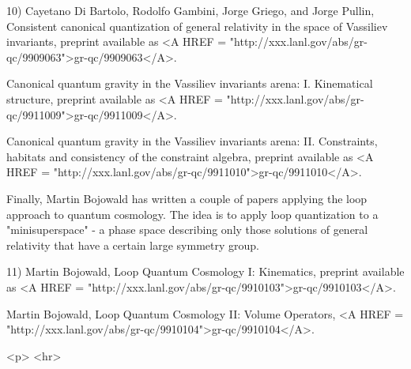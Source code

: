 10) Cayetano Di Bartolo, Rodolfo Gambini, Jorge Griego, and Jorge
Pullin, Consistent canonical quantization of general relativity in the
space of Vassiliev invariants, preprint available as <A HREF = "http://xxx.lanl.gov/abs/gr-qc/9909063">gr-qc/9909063</A>.

Canonical quantum gravity in the Vassiliev invariants arena:
I. Kinematical structure, preprint available as <A HREF = "http://xxx.lanl.gov/abs/gr-qc/9911009">gr-qc/9911009</A>.

Canonical quantum gravity in the Vassiliev invariants arena: II. 
Constraints, habitats and consistency of the constraint algebra,
preprint available as <A HREF = "http://xxx.lanl.gov/abs/gr-qc/9911010">gr-qc/9911010</A>.

Finally, Martin Bojowald has written a couple of papers applying the
loop approach to quantum cosmology.  The idea is to apply loop
quantization to a "minisuperspace" - a phase space describing only those
solutions of general relativity that have a certain large symmetry
group.

11) Martin Bojowald, Loop Quantum Cosmology I: Kinematics, preprint
available as <A HREF = "http://xxx.lanl.gov/abs/gr-qc/9910103">gr-qc/9910103</A>.

Martin Bojowald, Loop Quantum Cosmology II: Volume Operators, 
<A HREF = "http://xxx.lanl.gov/abs/gr-qc/9910104">gr-qc/9910104</A>.







<p> <hr>



